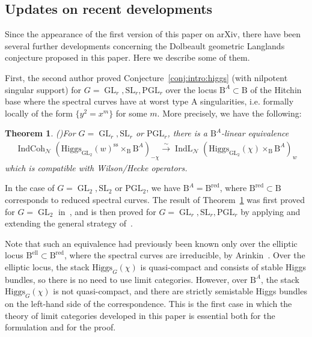 \documentclass [11pt,oneside,a4paper,mathscr]{amsart}
\newtheorem{thm}{Theorem}[section]
\theoremstyle{definition}
\newcommand{\IndCoh}{\operatorname{IndCoh}}
\newcommand{\IndL}{\operatorname{IndL}}
\newcommand{\GL}{\operatorname{GL}}
\newcommand{\Hig}{\mathrm{Higgs}}
\begin{document}
\subsection{Updates on recent developments}

Since the appearance of the first version of this paper on arXiv, 
there have been several further developments concerning the Dolbeault geometric Langlands conjecture proposed in this paper. 
Here we describe some of them. 

First, the second author proved Conjecture~\ref{conj:intro:higgs} (with nilpotent singular support) for $G=\GL_r, \mathrm{SL}_r, \mathrm{PGL}_r$ over the locus $\mathrm{B}^{A} \subset \mathrm{B}$ of the Hitchin base where the spectral curves have at worst type A singularities, i.e. formally locally of the form 
$\{y^2=x^m\}$ for some $m$. 
More precisely, we have the following: 
\begin{thm}\emph{(\cite{TodaGL2, TodaA})}\label{thm:BA}
For $G=\GL_r, \mathrm{SL}_r$ or $\mathrm{PGL}_r$, 
there is a $\mathrm{B}^{A}$-linear equivalence 
\begin{align*}
    \IndCoh_{\mathcal{N}}(\Hig_{\GL_2}(w)^{\mathrm{ss}}\times_{\mathrm{B}}\mathrm{B}^{A})_{-\chi} \stackrel{\sim}{\to}
    \IndL_{\mathcal{N}}(\Hig_{\GL_2}(\chi)\times_{\mathrm{B}}\mathrm{B}^{A})_{w}
\end{align*}
which is compatible with Wilson/Hecke operators. 
\end{thm}
In the case of $G=\GL_2, \mathrm{SL}_2$ or $\mathrm{PGL}_2$, we have $\mathrm{B}^A=\mathrm{B}^{\mathrm{red}}$, where
$\mathrm{B}^{\mathrm{red}} \subset \mathrm{B}$ corresponds to reduced spectral curves. The result of Theorem~\ref{thm:BA}
was first proved for $G=\GL_2$ in~\cite{TodaGL2}, and is then proved for $G=\GL_r, \mathrm{SL}_r, \mathrm{PGL}_r$
by applying and extending the general strategy of~\cite{TodaGL2}.


Note that such an equivalence had previously been known only over the elliptic locus 
$\mathrm{B}^{\mathrm{ell}} \subset \mathrm{B}^{\mathrm{red}}$, where the spectral curves are irreducible, by Arinkin~\cite{Ardual}. 
Over the elliptic locus, the stack 
$\Hig_G(\chi)$ is quasi-compact and consists of stable Higgs bundles, so there is no need to use limit categories. 
However, over $\mathrm{B}^{A}$, the stack $\Hig_G(\chi)$ is not 
quasi-compact, and there are strictly semistable Higgs bundles on the 
left-hand side of the correspondence. This is the first case 
in which the theory of limit categories developed in this paper is essential both for 
the formulation and for the proof. 
\end{document}
